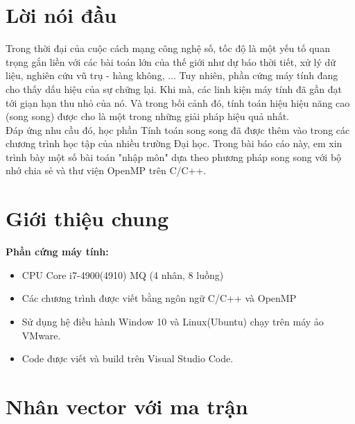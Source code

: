 \documentclass[12pt,a4paper]{report}
\begin{document}
\chapter*{Lời nói đầu}
Trong thời đại của cuộc cách mạng công nghệ số, tốc độ là một yếu tố quan trọng gắn liền với các bài toán lớn của thế giới như dự báo thời tiết, xử lý dữ liệu, nghiên cứu vũ trụ - hàng không, ...  Tuy nhiên, phần cứng máy tính đang cho thấy dấu hiệu của sự chững lại. Khi mà, các linh kiện máy tính đã gần đạt tới giạn hạn thu nhỏ của nó. Và trong bối cảnh đó, tính toán hiệu hiệu năng cao (song song) được cho là một trong những giải pháp hiệu quả nhất. \\
\vskip 1cm
Đáp ứng nhu cầu đó, học phần Tính toán song song đã được thêm vào trong các chương trình học tập của nhiều trường Đại học. Trong bài báo cáo này, em xin trình bày một số bài toán "nhập môn" dựa theo phương pháp song song với bộ nhớ chia sẻ và thư viện OpenMP trên C/C++.

\chapter*{Giới thiệu chung}
{\bf Phần cứng máy tính: }
\begin{itemize}
	\item CPU Core i7-4900(4910) MQ (4 nhân, 8 luồng)
	\item Các chương trình được viết bằng ngôn ngữ C/C++ và OpenMP
	\item Sử dụng hệ điều hành Window 10 và Linux(Ubuntu) chạy trên máy ảo VMware.
	\item Code được viết và build trên Visual Studio Code.
\end{itemize}

\tableofcontents	                        %


\chapter{Nhân vector với ma trận}         %
\end{document}
